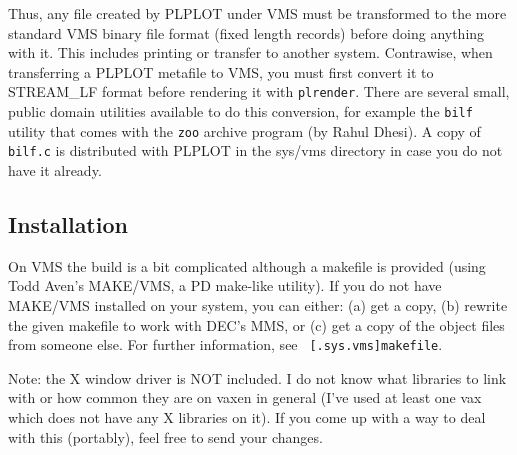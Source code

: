 Thus, any file created by PLPLOT under VMS must be transformed to the more
standard VMS binary file format (fixed length records) before doing anything
with it.  This includes printing or transfer to another system.  Contrawise,
when transferring a PLPLOT metafile to VMS, you must first convert it to
STREAM\_LF format before rendering it with {\tt plrender}.  There are
several small, public domain utilities available to do this conversion, for
example the {\tt bilf} utility that comes with the {\tt zoo} archive program
(by Rahul Dhesi).  A copy of {\tt bilf.c} is distributed with PLPLOT in the
sys/vms directory in case you do not have it already.

\subsection{Installation}

On VMS the build is a bit complicated although a makefile is provided
(using Todd Aven's MAKE/VMS, a PD make-like utility).  If you do not have
MAKE/VMS installed on your system, you can either: (a) get a copy, (b)
rewrite the given makefile to work with DEC's MMS, or (c) get a copy of the
object files from someone else.  For further information, see {\tt
[.sys.vms]makefile}. 

Note: the X window driver is NOT included.  I do not know what libraries to
link with or how common they are on vaxen in general (I've used at least
one vax which does not have any X libraries on it).  If you come up with a
way to deal with this (portably), feel free to send your changes. 
